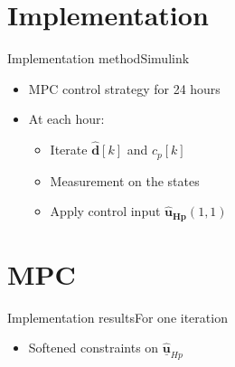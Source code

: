 \section{Implementation}

\begin{frame}{Implementation method}{Simulink}
\begin{itemize}
\item<1-> MPC control strategy for 24 hours
\item<1-> At each hour:
	 	\begin{itemize}
	 	\item<1-> Iterate $\hat{\pmb{d}}[k]$ and $c_p [k]$
	 	\item<1-> Measurement on the states 
	 	\item<1-> Apply control input $\pmb{\hat{u}_{Hp}}(1,1)$
	 	\end{itemize}
\end{itemize}

\begin{figure}[H]
\centering
 
\end{figure}

\end{frame}


\section{MPC}

\begin{frame}{Implementation results}{For one iteration}

\begin{itemize}
	 	\item<1-> Softened constraints on $\hat{\pmb{\underline{u}}}_{Hp}$
	 	\end{itemize}

\begin{figure}[H]
   \centering
    
\end{figure}

\end{frame}


